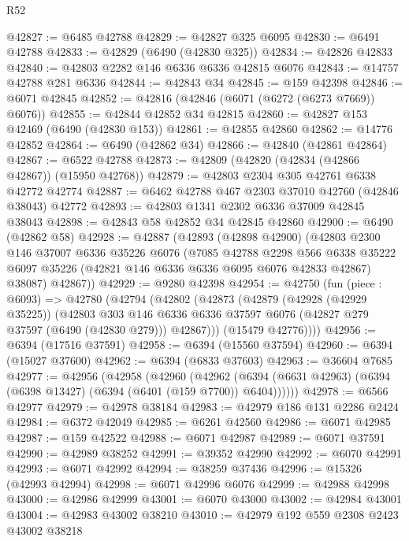 \begin{lexlean}{R52}
\begin{coremodule}
@42827 := @6485 @42788
@42829 := @42827 @325 @6095
@42830 := @6491 @42788
@42833 := @42829 (@6490 (@42830 @325))
@42834 := @42826 @42833
@42840 := @42803 @2282 @146 @6336 @6336 @42815 @6076
@42843 := @14757 @42788 @281 @6336
@42844 := @42843 @34
@42845 := @159 @42398
@42846 := @6071 @42845
@42852 := @42816 (@42846 (@6071 (@6272 (@6273 @7669)) @6076))
@42855 := @42844 @42852 @34 @42815
@42860 := @42827 @153 @42469 (@6490 (@42830 @153))
@42861 := @42855 @42860
@42862 := @14776 @42852
@42864 := @6490 (@42862 @34)
@42866 := @42840 (@42861 @42864)
@42867 := @6522 @42788
@42873 := @42809 (@42820 (@42834 (@42866 @42867)) (@15950 @42768))
@42879 := @42803 @2304 @305 @42761 @6338 @42772 @42774
@42887 := @6462 @42788 @467 @2303 @37010 @42760 (@42846 @38043) @42772
@42893 := @42803 @1341 @2302 @6336 @37009 @42845 @38043
@42898 := @42843 @58 @42852 @34 @42845 @42860
@42900 := @6490 (@42862 @58)
@42928 := @42887
    (@42893
      (@42898 @42900)
      (@42803
        @2300
        @146
        @37007
        @6336
        @35226
        @6076
        (@7085
          @42788
          @2298
          @566
          @6338
          @35222
          @6097
          @35226
          (@42821 @146 @6336 @6336 @6095 @6076 @42833 @42867)
          @38087)
        @42867))
@42929 := @9280 @42398
@42954 := @42750
    (fun (piece : @6093) =>
    @42780
      (@42794
        (@42802
          (@42873
            (@42879
              (@42928 (@42929 @35225))
              (@42803
                @303
                @146
                @6336
                @6336
                @37597
                @6076
                (@42827 @279 @37597 (@6490 (@42830 @279)))
                @42867)))
          (@15479 @42776))))
@42956 := @6394 (@17516 @37591)
@42958 := @6394 (@15560 @37594)
@42960 := @6394 (@15027 @37600)
@42962 := @6394 (@6833 @37603)
@42963 := @36604 @7685
@42977 := @42956
    (@42958
      (@42960
        (@42962 (@6394 (@6631 @42963) (@6394 (@6398 @13427) (@6394 (@6401 (@159 @7700)) @6404))))))
@42978 := @6566 @42977
@42979 := @42978 @38184
@42983 := @42979 @186 @131 @2286 @2424
@42984 := @6372 @42049
@42985 := @6261 @42560
@42986 := @6071 @42985
@42987 := @159 @42522
@42988 := @6071 @42987
@42989 := @6071 @37591
@42990 := @42989 @38252
@42991 := @39352 @42990
@42992 := @6070 @42991
@42993 := @6071 @42992
@42994 := @38259 @37436
@42996 := @15326 (@42993 @42994)
@42998 := @6071 @42996 @6076
@42999 := @42988 @42998
@43000 := @42986 @42999
@43001 := @6070 @43000
@43002 := @42984 @43001
@43004 := @42983 @43002 @38210
@43010 := @42979 @192 @559 @2308 @2423 @43002 @38218

\end{coremodule}
\end{lexlean}
